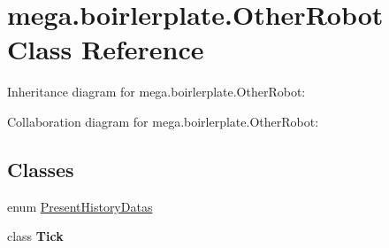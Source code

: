 \hypertarget{classmega_1_1boirlerplate_1_1_other_robot}{}\section{mega.\+boirlerplate.\+Other\+Robot Class Reference}
\label{classmega_1_1boirlerplate_1_1_other_robot}


Inheritance diagram for mega.\+boirlerplate.\+Other\+Robot\+:


Collaboration diagram for mega.\+boirlerplate.\+Other\+Robot\+:
\subsection*{Classes}
\begin{DoxyCompactItemize}
\item 
enum \hyperlink{enummega_1_1boirlerplate_1_1_other_robot_1_1_present_history_datas}{Present\+History\+Datas}
\item 
class {\bfseries Tick}
\end{DoxyCompactItemize}
